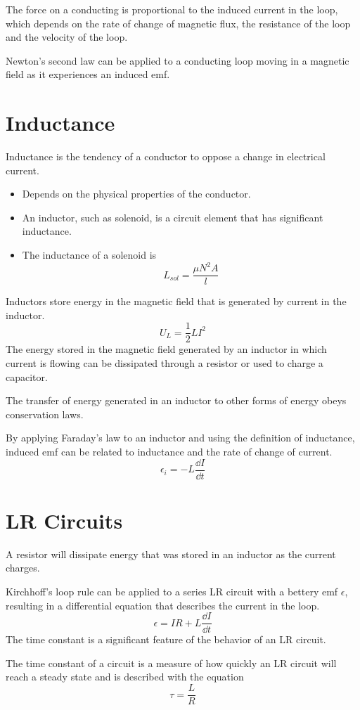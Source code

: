 \documentclass[../em.tex]{subfiles}
\begin{document}
The force on a conducting is proportional to the induced current in the loop, which depends on the rate of change of magnetic flux, the resistance 
of the loop and the velocity of the loop.

Newton's second law can be applied to a conducting loop moving in a magnetic field as it experiences an induced emf.
\section{Inductance}
Inductance is the tendency of a conductor to oppose a change in electrical current.
\begin{itemize}
    \item Depends on the physical properties of the conductor.
    \item An inductor, such as solenoid, is a circuit element that has significant inductance.
    \item The inductance of a solenoid is 
    \[ L_{sol} = \frac{\mu N^2 A}{l} \]
\end{itemize}

Inductors store energy in the magnetic field that is generated by current in the inductor.
\[ U_L = \frac{1}{2}LI^2 \]
The energy stored in the magnetic field generated by an inductor in which current is flowing can be dissipated through a resistor or used to charge a capacitor.

The transfer of energy generated in an inductor to other forms of energy obeys conservation laws.

By applying Faraday's law to an inductor and using the definition of inductance, induced emf can be related to inductance and the rate of change of current.
\[ \epsilon_i = -L \frac{\dd I}{\dd t} \]

\section{LR Circuits}
A resistor will dissipate energy that was stored in an inductor as the current charges.

Kirchhoff's loop rule can be applied to a series LR circuit with a bettery emf $\epsilon$, resulting in a differential equation that describes the current in the loop.
\[ \epsilon = IR + L\frac{\dd I}{\dd t}\]
The time constant is a significant feature of the behavior of an LR circuit.

The time constant of a circuit is a measure of how quickly an LR circuit will reach a steady state and is described with the equation 
\[ \tau = \frac{L}{R}\]
\end{document}
